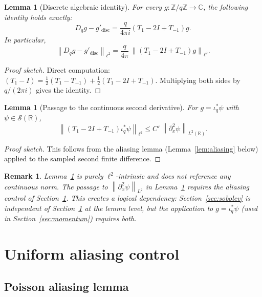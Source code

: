 \documentclass[12pt,a4paper]{article}
\newtheorem{lemma}[theorem]{Lemma}
\newtheorem{remark}[theorem]{Remark}
\newcommand{\Zq}{\mathbb{Z}/q\mathbb{Z}}
\newcommand{\Schwartz}{\mathcal{S}(\mathbb{R})}
\newcommand{\iotastar}{\iota_q^*}
\newcommand{\norm}[1]{\left\|#1\right\|}
\begin{document}
    \begin{lemma}[Discrete algebraic identity]
      \label{lem:sobolev}
      For every $g : \Zq \to \mathbb{C}$, the following identity holds exactly:
      \[
        D_q g - g'_{\mathrm{disc}}
        = \frac{q}{4\pi i}(T_1 - 2I + T_{-1})g.
      \]
      In particular,
      \[
        \norm{D_q g - g'_{\mathrm{disc}}}_{\ell^2}
        = \frac{q}{4\pi}\,\norm{(T_1 - 2I + T_{-1})g}_{\ell^2}.
      \]
    \end{lemma}

    \begin{proof}
      [Proof sketch]
Direct computation: $(T_1 - I) = \frac{1}{2}(T_1 - T_{-1}) + \frac{1}{2}(T_1 - 2I + T_{-1})$.
Multiplying both sides by $q/(2\pi i)$ gives the identity.
    \end{proof}

    \begin{lemma}[Passage to the continuous second derivative]
      \label{lem:sobolev-continuous}
      For $g = \iotastar\psi$ with $\psi \in \Schwartz$,
      \[
        \norm{(T_1 - 2I + T_{-1})\iotastar\psi}_{\ell^2} \leq C'\,\norm{\partial_x^2 \psi}_{L^2(\mathbb{R})}.
      \]
    \end{lemma}

    \begin{proof}
      [Proof sketch]
This follows from the aliasing lemma (Lemma~\ref{lem:aliasing} below) applied to
the sampled second finite difference.
    \end{proof}

    \begin{remark}
      Lemma~\ref{lem:sobolev} is purely $\ell^2$-intrinsic and does not reference any
      continuous norm.
      The passage to $\norm{\partial_x^2\psi}_{L^2}$ in Lemma~\ref{lem:sobolev-continuous}
      requires the aliasing control of Section~\ref{sec:aliasing}.
      This creates a logical dependency: Section~\ref{sec:sobolev} is independent of
      Section~\ref{sec:aliasing} at the lemma level, but the application to
      $g = \iotastar\psi$ (used in Section~\ref{sec:momentum}) requires both.
    \end{remark}

    \newpage
  \section{Uniform aliasing control}
    \label{sec:aliasing}

    \subsection{Poisson aliasing lemma}
\end{document}
